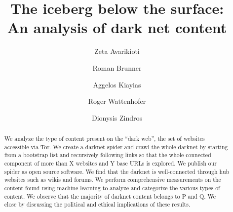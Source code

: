 \documentclass[USenglish,oneside,twocolumn]{article}
\begin{document}
 

  \author*[1]{Zeta Avarikioti}

  \author[2]{Roman Brunner}

  \author[3]{Aggelos Kiayias}

  \author[4]{Roger Wattenhofer}

  \author[5]{Dionysis Zindros}






  \title{\huge The iceberg below the surface:\\ An analysis of dark net content}



  \begin{abstract}
{We analyze the type of content present on the “dark web”, the set of websites accessible via Tor. We create a darknet spider and crawl the whole darknet by starting from a bootstrap list and recursively following links so that the whole connected component of more than X websites and Y base URLs is explored. We publish our spider as open source software. We find that the darknet is well-connected through hub websites such as wikis and forums. We perform comprehensive measurements on the content found using machine learning to analyze and categorize the various types of content. We observe that the majority of darknet content belongs to P and Q. We close by discussing the political and ethical implications of these results.}
\end{abstract}


 

\maketitle
\end{document}
